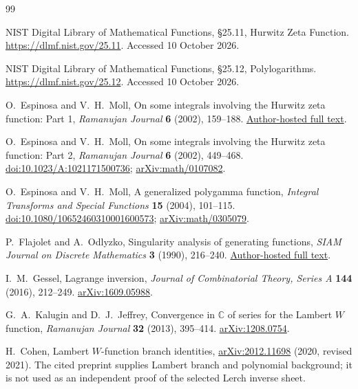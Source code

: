 \documentclass[11pt,a4paper]{article}
\numberwithin{equation}{section}
\theoremstyle{definition}
\theoremstyle{remark}
\begin{document}
\begin{thebibliography}{99}
\small\raggedright
\setlength{\itemsep}{1pt}
\setlength{\parskip}{0pt}
\setlength{\parsep}{0pt}
NIST Digital Library of Mathematical Functions, \S25.11,
Hurwitz Zeta Function. \url{https://dlmf.nist.gov/25.11}.
Accessed 10 October 2026.

NIST Digital Library of Mathematical Functions, \S25.12,
Polylogarithms. \url{https://dlmf.nist.gov/25.12}.
Accessed 10 October 2026.

O.~Espinosa and V.~H.~Moll, On some integrals involving the Hurwitz
zeta function: Part 1, \emph{Ramanujan Journal} \textbf{6} (2002),
159--188.
\href{https://www.math.tulane.edu/~vhm/papers_html/hurwitz1.pdf}{Author-hosted full text}.

O.~Espinosa and V.~H.~Moll, On some integrals involving the Hurwitz
zeta function: Part 2, \emph{Ramanujan Journal} \textbf{6} (2002),
449--468.
\href{https://doi.org/10.1023/A:1021171500736}{doi:10.1023/A:1021171500736};
\href{https://arxiv.org/abs/math/0107082}{arXiv:math/0107082}.

O.~Espinosa and V.~H.~Moll, A generalized polygamma function,
\emph{Integral Transforms and Special Functions} \textbf{15} (2004),
101--115.
\href{https://doi.org/10.1080/10652460310001600573}{doi:10.1080/10652460310001600573};
\href{https://arxiv.org/abs/math/0305079}{arXiv:math/0305079}.

P.~Flajolet and A.~Odlyzko, Singularity analysis of generating functions,
\emph{SIAM Journal on Discrete Mathematics} \textbf{3} (1990),
216--240.
\href{https://algo.inria.fr/flajolet/Publications/FlOd90b.pdf}{Author-hosted full text}.

I.~M.~Gessel, Lagrange inversion, \emph{Journal of Combinatorial
Theory, Series A} \textbf{144} (2016), 212--249.
\href{https://arxiv.org/abs/1609.05988}{arXiv:1609.05988}.

G.~A.~Kalugin and D.~J.~Jeffrey, Convergence in $\mathbb C$ of series
for the Lambert $W$ function, \emph{Ramanujan Journal}
\textbf{32} (2013), 395--414.
\href{https://arxiv.org/abs/1208.0754}{arXiv:1208.0754}.

H.~Cohen, Lambert $W$-function branch identities,
\href{https://arxiv.org/abs/2012.11698}{arXiv:2012.11698} (2020,
revised 2021). The cited preprint supplies Lambert branch and polynomial
background; it is not used as an independent proof of the selected
Lerch inverse sheet.


\end{thebibliography}
\end{document}
